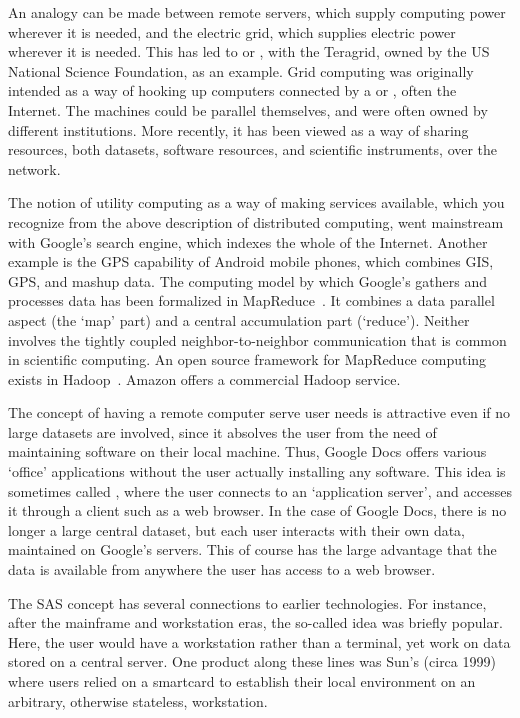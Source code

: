 An analogy can be made between remote servers, which supply computing
power wherever it is needed, and the electric grid, which supplies
electric power wherever it is needed. This has led to  or , with the Teragrid,
owned by the US National Science Foundation, as an example. Grid
computing was originally intended as a way of hooking up computers
connected by a  or , often the Internet. The machines
could be parallel themselves, and were often owned by different
institutions. More recently, it has been viewed as a way of sharing
resources, both datasets, software resources, and scientific
instruments, over the network.

The notion of utility computing as a way of making services available,
which you recognize from the above description of distributed
computing, went mainstream
with Google's search engine, which
indexes the whole of the Internet. Another example is the GPS capability
of Android mobile phones, which combines GIS, GPS, and mashup
data. The computing model by which Google's gathers and processes data
has been formalized in
MapReduce~\cite{Google:mapreduce}. It combines a data parallel aspect (the
`map' part) and a central accumulation part (`reduce'). Neither
involves the tightly coupled neighbor-to-neighbor communication that
is common in scientific computing.
%
An open
source framework for MapReduce computing exists in
Hadoop~\cite{Hadoop-wiki}. Amazon offers a commercial Hadoop service.

The concept of having a remote computer serve user needs is attractive
even if no large datasets are involved, since it absolves the user
from the need of maintaining software on their local machine. Thus,
Google Docs offers various `office'
applications without the user actually installing any software. This
idea is sometimes called , where
the user connects to an `application server', and accesses it through
a client such as a web browser. In the case of Google Docs, there is
no longer a large central dataset, but each user interacts with their
own data, maintained on Google's servers. This of course has the large
advantage that the data is available from anywhere the user has access
to a web browser.

The \ac{SAS} concept has several connections to earlier
technologies. For instance, after the mainframe and workstation eras,
the so-called  idea was briefly popular. Here,
the user would have a workstation rather than a terminal, yet work on
data stored on a central server. One product along these lines was
Sun's  (circa 1999) where users relied on a smartcard to
establish their local environment on an arbitrary, otherwise stateless,
workstation.

